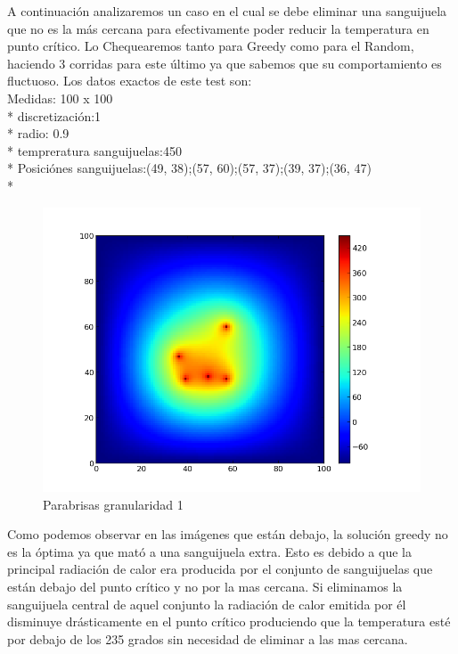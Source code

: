 A continuación analizaremos un caso en el cual se debe eliminar una sanguijuela que no es la más cercana para efectivamente poder reducir la temperatura en punto crítico. Lo Chequearemos tanto para Greedy como para el Random, haciendo 3 corridas para este último ya que sabemos que su comportamiento es fluctuoso.
Los datos exactos de este test son:\\
Medidas: 100 x 100 \\* 
discretización:1 \\* 
radio: 0.9 \\* 
tempreratura sanguijuelas:450 \\* 
Posiciónes sanguijuelas:(49, 38);(57, 60);(57, 37);(39, 37);(36, 47) \\* 
\begin{figure}[htb]
\begin{center}
\includegraphics[scale=0.40]{imagenes/test6.png} 
\caption{Parabrisas granularidad 1} 
\end{center}
\end{figure}

Como podemos observar en las imágenes que están debajo, la solución greedy no es la óptima ya que mató a una sanguijuela extra. Esto es debido a que la principal radiación de calor era producida por el conjunto de 
sanguijuelas que están debajo del punto crítico y no por la mas cercana. Si eliminamos la sanguijuela central de aquel conjunto la radiación de calor emitida por él disminuye drásticamente en el punto crítico produciendo 
que la temperatura esté por debajo de los 235 grados sin necesidad de eliminar a las mas cercana. 

